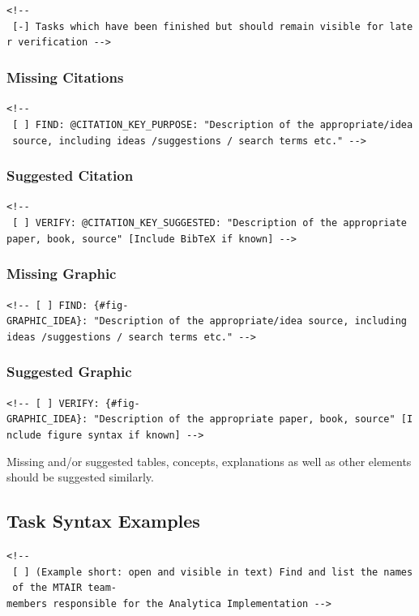 \documentclass[
  11pt,
  letterpaper,
]{book}
\begin{document}
\texttt{\textless{}!-\/-\ {[}-{]}\ Tasks\ which\ have\ been\ finished\ but\ should\ remain\ visible\ for\ later\ verification\ -\/-\textgreater{}}

\subsubsection{Missing Citations}\label{missing-citations-1}

\texttt{\textless{}!-\/-\ {[}\ {]}\ FIND:\ @CITATION\_KEY\_PURPOSE:\ "Description\ of\ the\ appropriate/idea\ source,\ including\ ideas\ /suggestions\ /\ search\ terms\ etc."\ -\/-\textgreater{}}

\subsubsection{Suggested Citation}\label{suggested-citation-1}

\texttt{\textless{}!-\/-\ {[}\ {]}\ VERIFY:\ @CITATION\_KEY\_SUGGESTED:\ "Description\ of\ the\ appropriate\ paper,\ book,\ source"\ {[}Include\ BibTeX\ if\ known{]}\ -\/-\textgreater{}}

\subsubsection{Missing Graphic}\label{missing-graphic-1}

\texttt{\textless{}!-\/-\ {[}\ {]}\ FIND:\ \{\#fig-GRAPHIC\_IDEA\}:\ "Description\ of\ the\ appropriate/idea\ source,\ including\ ideas\ /suggestions\ /\ search\ terms\ etc."\ -\/-\textgreater{}}

\subsubsection{Suggested Graphic}\label{suggested-graphic-1}

\texttt{\textless{}!-\/-\ {[}\ {]}\ VERIFY:\ \{\#fig-GRAPHIC\_IDEA\}:\ "Description\ of\ the\ appropriate\ paper,\ book,\ source"\ {[}Include\ figure\ syntax\ if\ known{]}\ -\/-\textgreater{}}

Missing and/or suggested tables, concepts, explanations as well as other
elements should be suggested similarly.

\subsection{Task Syntax Examples}\label{task-syntax-examples-1}

\texttt{\textless{}!-\/-\ {[}\ {]}\ (Example\ short:\ open\ and\ visible\ in\ text)\ Find\ and\ list\ the\ names\ of\ the\ MTAIR\ team-members\ responsible\ for\ the\ Analytica\ Implementation\ -\/-\textgreater{}}
\end{document}
